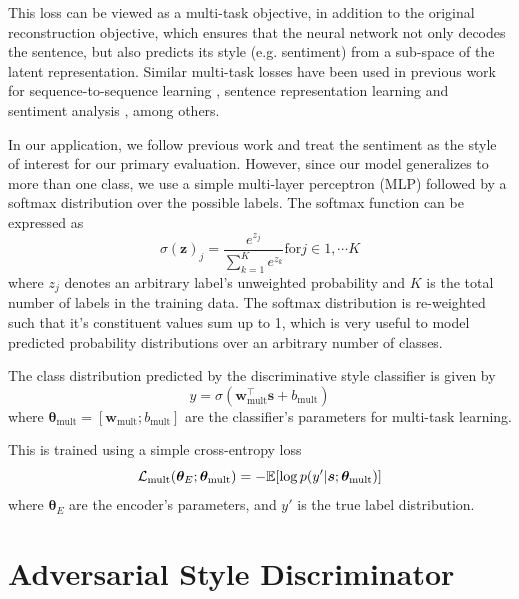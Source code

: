 This loss can be viewed as a multi-task objective, in addition to the original reconstruction objective, which ensures that the neural network not only decodes the sentence, but also predicts its style (e.g. sentiment) from a sub-space of the latent representation. Similar multi-task losses have been used in previous work for sequence-to-sequence learning \citep{luong2015multi}, sentence representation learning \citep{jernite2017discourse} and sentiment analysis \citep{balikas2017multitask}, among others.

In our application, we follow previous work \citep{hu2017toward,shen2017style,fu2017style} and treat the sentiment as the style of interest for our primary evaluation. However, since our model generalizes to more than one class, we use a simple multi-layer perceptron (MLP) followed by a softmax distribution over the possible labels. The softmax function can be expressed as
\begin{equation*}
	\sigma(\mathbf{z})_j = \frac{e^{z_j}}{\sum_{k=1}^K e^{z_k}} \text{for} j \in {1, \cdots K}
\end{equation*}
where $z_j$ denotes an arbitrary label's unweighted probability and $K$ is the total number of labels in the training data. The softmax distribution is re-weighted such that it's constituent values sum up to 1, which is very useful to model predicted probability distributions over an arbitrary number of classes.

The class distribution predicted by the discriminative style classifier is given by
\begin{equation} \label{eqn:class-pred}
	y = \sigma(\bm w_\text{mult}^\top \bm s + b_\text{mult})
\end{equation}
where $\bm\theta_\text{mult}=[\bm w_\text{mult}; b_\text{mult}]$ are the classifier's parameters for multi-task learning.

This is trained using a simple cross-entropy loss
\begin{equation} \label{eqn:multi-task-loss}
	\mathcal{L}_\text{mult}(\bm\theta_{E};\bm\theta_\text{mult}) =
	- \mathbb{E} [\log p(y' | \bm s; \bm\theta_\text{mult})]
\end{equation}
where $\bm\theta_E$ are the encoder's parameters, and $y'$ is the true label distribution.


\section{Adversarial Style Discriminator} \label{sec:adversarial-style-objective}

